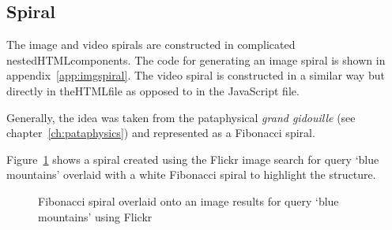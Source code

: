 \subsection{Spiral}
\label{s:spiral}

The image and video spirals are constructed in complicated nested\ac{HTML}components. The code for generating an image spiral is shown in appendix~\ref{app:imgspiral}. The video spiral is constructed in a similar way but directly in the\ac{HTML}file as opposed to in the JavaScript file.

Generally, the idea was taken from the pataphysical \emph{grand gidouille} (see chapter~\ref{ch:pataphysics}) and represented as a Fibonacci spiral. 

Figure~\ref{img:fibspiral} shows a spiral created using the Flickr image search for query `blue mountains' overlaid with a white Fibonacci spiral to highlight the structure.

\begin{figure}[!htbp] %
  \centering
  \caption[Fibonacci image spiral]{Fibonacci spiral overlaid onto an image results for query `blue mountains' using Flickr}
  \label{img:fibspiral}
\end{figure}


